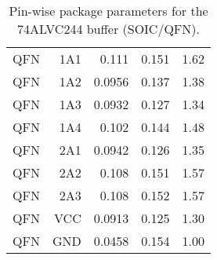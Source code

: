 \documentclass[../main.tex]{subfiles}
\begin{document}
\begin{table}[h]
\begin{tabular}{r|r r r r}
        QFN  & 1A1  & 0.111  & 0.151 & 1.62 \\
        QFN  & 1A2  & 0.0956 & 0.137 & 1.38 \\
        QFN  & 1A3  & 0.0932 & 0.127 & 1.34 \\
        QFN  & 1A4  & 0.102  & 0.144 & 1.48 \\
        QFN  & 2A1  & 0.0942 & 0.126 & 1.35 \\
        QFN  & 2A2  & 0.108  & 0.151 & 1.57 \\
        QFN  & 2A3  & 0.108  & 0.152 & 1.57 \\
        \midrule
        QFN  & VCC  & 0.0913 & 0.125 & 1.30 \\
        QFN  & GND  & 0.0458 & 0.154 & 1.00 \\
        \bottomrule[1pt]
    \end{tabular}
    \caption{Pin-wise package parameters for the 74ALVC244 buffer (SOIC/QFN).}
    \label{tab:pkg-params}
\end{table}

\newpage
\end{document}

